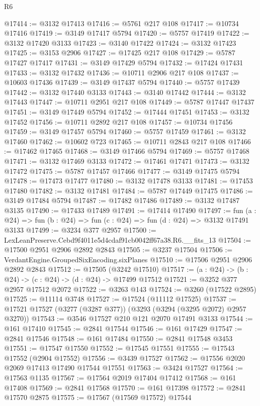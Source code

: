 \begin{lexlean}{R6}
\begin{coremodule}
@17414 := @3132 @17413
@17416 := @5761 @217 @108
@17417 := @10734 @17416
@17419 := @3149 @17417 @5794
@17420 := @5757 @17419
@17422 := @3132 @17420 @3133
@17423 := @3140 @17422
@17424 := @3132 @17423
@17425 := @3153 @2906
@17427 := @17425 @217 @108
@17429 := @5787 @17427 @17417
@17431 := @3149 @17429 @5794
@17432 := @17424 @17431
@17433 := @3132 @17432
@17436 := @10711 @2906 @217 @108
@17437 := @10603 @17436
@17439 := @3149 @17437 @5794
@17440 := @5757 @17439
@17442 := @3132 @17440 @3133
@17443 := @3140 @17442
@17444 := @3132 @17443
@17447 := @10711 @2951 @217 @108
@17449 := @5787 @17447 @17437
@17451 := @3149 @17449 @5794
@17452 := @17444 @17451
@17453 := @3132 @17452
@17456 := @10711 @2892 @217 @108
@17457 := @10734 @17456
@17459 := @3149 @17457 @5794
@17460 := @5757 @17459
@17461 := @3132 @17460
@17462 := @10602 @723
@17465 := @10711 @2843 @217 @108
@17466 := @17462 @17465
@17468 := @3149 @17466 @5794
@17469 := @5757 @17468
@17471 := @3132 @17469 @3133
@17472 := @17461 @17471
@17473 := @3132 @17472
@17475 := @5787 @17457 @17466
@17477 := @3149 @17475 @5794
@17478 := @17473 @17477
@17480 := @3132 @17478 @3133
@17481 := @17453 @17480
@17482 := @3132 @17481
@17484 := @5787 @17449 @17475
@17486 := @3149 @17484 @5794
@17487 := @17482 @17486
@17489 := @3132 @17487 @3135
@17490 := @17433 @17489
@17491 := @17414 @17490
@17497 := fun (a : @24) => fun (b : @24) => fun (c : @24) => fun (d : @24) => @3132 @17491 @3133
@17499 := @3234 @377 @2957
@17500 := LexLeanPreserve.Cebd9f4011e5d4cdaf91cb0042ff67a38.R6.__fits_13
@17504 := @17500 @2951 @2906 @2892 @2843
@17505 := @3237 @17504
@17506 := VerdantEngine.GroupedSixEncoding.sixPlanes
@17510 := @17506 @2951 @2906 @2892 @2843
@17512 := @17505 (@3242 @17510)
@17517 := (a : @24) -> (b : @24) -> (c : @24) -> (d : @24) -> @17499 @17512
@17521 := @3252 @377 @2957 @17512 @2072
@17522 := @3263 @143
@17524 := @3260 (@17522 @2895)
@17525 := @11114 @3748
@17527 := @17524 (@11112 @17525)
@17537 := @17521 @17527 (@3277 (@3287 @377)) (@3293 (@3294 (@3295 @2072) @2957 @3270))
@17543 := @3546 @17527 @210 @121 @2070 @17491 @3133
@17544 := @161 @17410
@17545 := @2841 @17544
@17546 := @161 @17429
@17547 := @2841 @17546
@17548 := @161 @17484
@17550 := @2841 @17548 @3453
@17551 := @17547 @17550
@17552 := @17545 @17551
@17555 := @17543 @17552 (@2904 @17552)
@17556 := @3439 @17527
@17562 := @17556 @2020 @2069 @17413 @17490 @17544 @17551
@17563 := @3424 @17527
@17564 := @17563 @1135
@17567 := @17564 @2019 @17404 @17412
@17568 := @161 @17408
@17569 := @2841 @17568
@17570 := @161 @17398
@17572 := @2841 @17570 @2875
@17575 := @17567 (@17569 @17572) @17544

\end{coremodule}
\end{lexlean}
